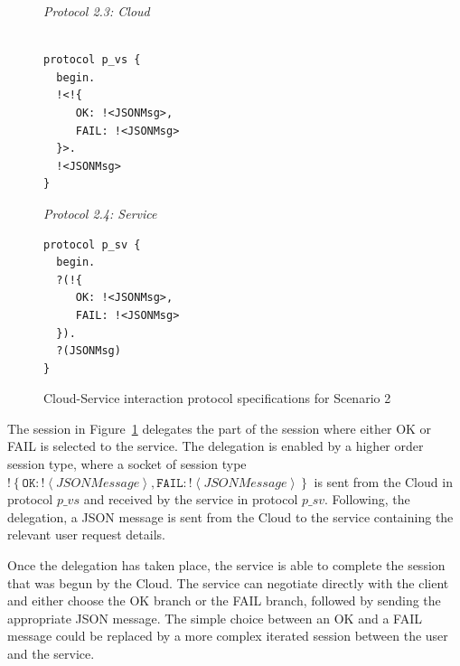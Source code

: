 \documentclass[10pt]{llncs}
\begin{document}

{
\lstset{
  framerule=0pt,
  numbers=none,
  basicstyle=\ttfamily\scriptsize,
}
\renewcommand\lstlistingname{Protocol}
\setcounter{lstlisting}{0}
\begin{figure}[h]

\begin{minipage}[t]{0.50\textwidth}
{\it\footnotesize Protocol 2.3: Cloud}
\begin{lstlisting}

protocol p_vs {
  begin.
  !<!{
     OK: !<JSONMsg>, 
     FAIL: !<JSONMsg>
  }>.
  !<JSONMsg>    
}

\end{lstlisting}
\end{minipage}
\begin{minipage}[t]{0.50\textwidth}
{\it\footnotesize Protocol 2.4: Service}
\begin{lstlisting}
protocol p_sv {
  begin.
  ?(!{
     OK: !<JSONMsg>,
     FAIL: !<JSONMsg> 
  }).
  ?(JSONMsg) 
}
\end{lstlisting}
\end{minipage}
\caption{Cloud-Service interaction protocol specifications for Scenario 2}\label{fig:cloud-saas-providers} 
\end{figure}
}

The session in Figure~\ref{fig:cloud-saas-providers} delegates the part of the session where either OK or FAIL is selected to the service. 
The delegation is enabled by a higher order session type, where a socket of session type $\mathopen{!}\left\{\texttt{OK}\colon \mathopen{!}\left<\textit{JSONMessage}\right>, \texttt{FAIL}\colon \mathopen{!}\left<\textit{JSONMessage}\right>\right\}$ is sent from the Cloud in protocol $p\_vs$ and received by the service in protocol $p\_sv$. 
Following, the delegation, a JSON message is sent from the Cloud to the service containing the relevant user request details.


Once the delegation has taken place, the service is able to complete the session that was begun by the Cloud. The service can negotiate directly with the client and either choose the OK branch or the FAIL branch, followed by sending the appropriate JSON message. The simple choice between an OK and a FAIL message could be replaced by a more complex iterated session between the user and the service.
\end{document}
